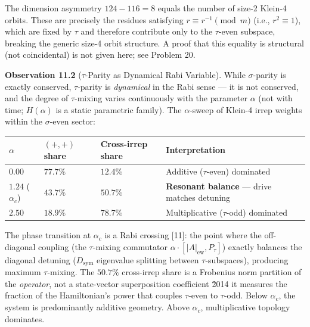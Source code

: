 \documentclass[11pt,letterpaper]{article}
\theoremstyle{definition}
\theoremstyle{remark}
\begin{document}
The dimension asymmetry $124 - 116 = 8$ equals the number of size-2 Klein-4 orbits. These are precisely the residues satisfying $r \equiv r^{-1} \pmod{m}$ (i.e., $r^2 \equiv 1$), which are fixed by $\tau$ and therefore contribute only to the $\tau$-even subspace, breaking the generic size-4 orbit structure. A proof that this equality is structural (not coincidental) is not given here; see Problem 20.

\textbf{Observation 11.2} ($\tau$-Parity as Dynamical Rabi Variable). While $\sigma$-parity is exactly conserved, $\tau$-parity is \emph{dynamical} in the Rabi sense --- it is not conserved, and the degree of $\tau$-mixing varies continuously with the parameter $\alpha$ (not with time; $H(\alpha)$ is a static parametric family). The $\alpha$-sweep of Klein-4 irrep weights within the $\sigma$-even sector:

\begin{longtable}[]{@{}
  >{\raggedright\arraybackslash}p{}
  >{\raggedright\arraybackslash}p{}
  >{\raggedright\arraybackslash}p{}
  >{\raggedright\arraybackslash}p{}@{}}
\toprule
$\alpha$ & $(+,+)$ share & Cross-irrep share & Interpretation \\
\midrule
\endhead
\bottomrule
$0.00$ & $77.7\%$ & $12.4\%$ & Additive ($\tau$-even) dominated \\
$1.24$ ($\alpha_c$) & $43.7\%$ & $50.7\%$ & \textbf{Resonant balance} --- drive matches detuning \\
$2.50$ & $18.9\%$ & $78.7\%$ & Multiplicative ($\tau$-odd) dominated \\
\end{longtable}

The phase transition at $\alpha_c$ is a Rabi crossing [11]: the point where the off-diagonal coupling (the $\tau$-mixing commutator $\alpha \cdot [|A|_{\text{ew}}, P_\tau]$) exactly balances the diagonal detuning ($D_{\text{sym}}$ eigenvalue splitting between $\tau$-subspaces), producing maximum $\tau$-mixing. The $50.7\%$ cross-irrep share is a Frobenius norm partition of the \emph{operator}, not a state-vector superposition coefficient \u2014 it measures the fraction of the Hamiltonian's power that couples $\tau$-even to $\tau$-odd. Below $\alpha_c$, the system is predominantly additive geometry. Above $\alpha_c$, multiplicative topology dominates.
\end{document}
